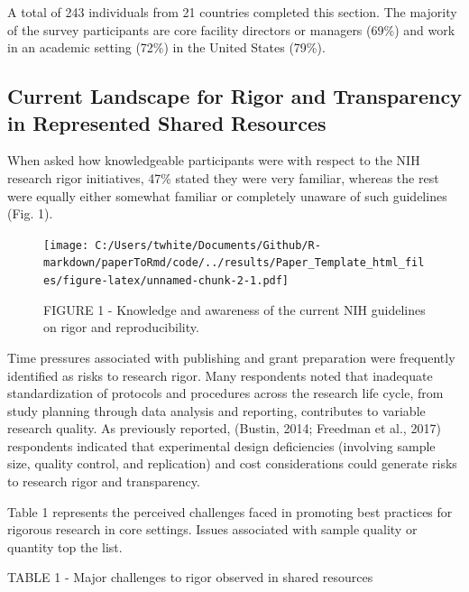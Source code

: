 \documentclass[]{article}
\begin{document}
A total of 243 individuals from 21 countries completed this section. The
majority of the survey participants are core facility directors or
managers (69\%) and work in an academic setting (72\%) in the United
States (79\%).

\subsection{Current Landscape for Rigor and Transparency in Represented
Shared
Resources}\label{current-landscape-for-rigor-and-transparency-in-represented-shared-resources}

When asked how knowledgeable participants were with respect to the NIH
research rigor initiatives, 47\% stated they were very familiar, whereas
the rest were equally either somewhat familiar or completely unaware of
such guidelines (Fig. 1).

\begin{figure}
\centering
\texttt{[image: C:/Users/twhite/Documents/Github/R-markdown/paperToRmd/code/../results/Paper\_Template\_html\_files/figure-latex/unnamed-chunk-2-1.pdf]}
\caption{FIGURE 1 - Knowledge and awareness of the current NIH
guidelines on rigor and reproducibility.}
\end{figure}

Time pressures associated with publishing and grant preparation were
frequently identified as risks to research rigor. Many respondents noted
that inadequate standardization of protocols and procedures across the
research life cycle, from study planning through data analysis and
reporting, contributes to variable research quality. As previously
reported, (Bustin, 2014; Freedman et al., 2017) respondents indicated
that experimental design deficiencies (involving sample size, quality
control, and replication) and cost considerations could generate risks
to research rigor and transparency.

Table 1 represents the perceived challenges faced in promoting best
practices for rigorous research in core settings. Issues associated with
sample quality or quantity top the list.

TABLE 1 - Major challenges to rigor observed in shared resources
\end{document}
